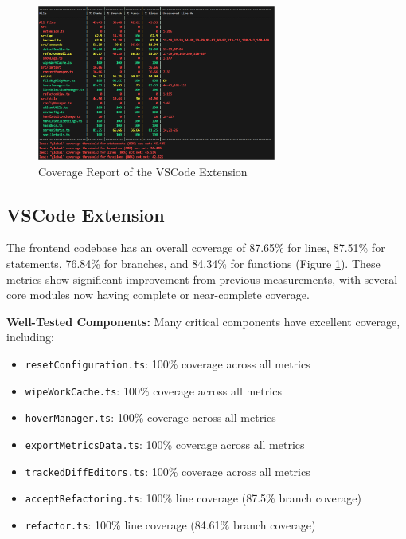 \documentclass[12pt, titlepage]{article}
\begin{document}
\begin{figure}[H]
  \centering
  \includegraphics[width=0.7\textwidth]{../Images/vscode-coverage.png}
  \caption{Coverage Report of the VSCode Extension}
  \label{img:vscode-cov}
\end{figure}

\subsection{VSCode Extension}
The frontend codebase has an overall coverage of 87.65\% for
lines, 87.51\% for statements, 76.84\% for branches, and 84.34\% for functions
(Figure \ref{img:vscode-cov}). These metrics show significant improvement from previous
measurements, with several core modules now having complete or near-complete coverage.

\noindent \textbf{Well-Tested Components:} Many critical components have excellent coverage, including:
\begin{itemize}
  \item \texttt{resetConfiguration.ts}: 100\% coverage across all metrics
  \item \texttt{wipeWorkCache.ts}: 100\% coverage across all metrics
  \item \texttt{hoverManager.ts}: 100\% coverage across all metrics
  \item \texttt{exportMetricsData.ts}: 100\% coverage across all metrics
  \item \texttt{trackedDiffEditors.ts}: 100\% coverage across all metrics
  \item \texttt{acceptRefactoring.ts}: 100\% line coverage (87.5\% branch coverage)
  \item \texttt{refactor.ts}: 100\% line coverage (84.61\% branch coverage)
\end{itemize}
\end{document}
